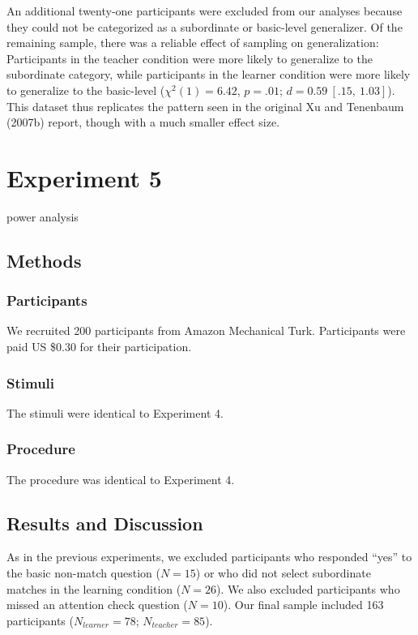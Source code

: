 \documentclass[man]{apa2}
\begin{document}
An additional twenty-one participants were excluded from our analyses because they could not be categorized as a subordinate or basic-level generalizer. Of the remaining sample, there was a reliable effect of sampling on generalization: Participants in the teacher condition were more likely to generalize to the subordinate category, while participants in the learner condition were more likely to generalize to the basic-level ($\chi^2(1) = 6.42$, $p = .01$; $d = 0.59\ [.15,\ 1.03]$). This dataset thus replicates the pattern seen in the original Xu and Tenenbaum (2007b) report, though with a much smaller effect size.

\section{Experiment 5}
power analysis
\subsection{Methods}

\subsubsection{Participants}  We recruited 200 participants from Amazon Mechanical Turk. Participants were paid US \$0.30 for their participation.

\subsubsection{Stimuli}
The stimuli were identical to Experiment 4.

\subsubsection{Procedure}
The procedure was identical to Experiment 4.

\subsection{Results and Discussion}

As in the previous experiments, we excluded participants who responded ``yes'' to the basic non-match question ($N=15$) or who did not select subordinate matches in the learning condition ($N = 26$). We also excluded participants who missed an attention check question ($N = 10$). Our final sample included 163 participants ($N_{learner} = 78$; $N_{teacher} = 85$).
\end{document}
